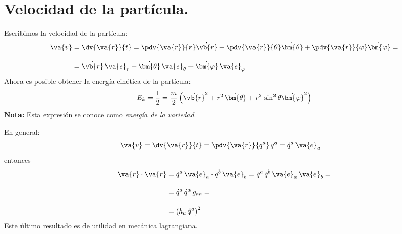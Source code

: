 \section{Velocidad de la partícula.}
Escribimos la velocidad de la partícula:
\begin{align*}
\va{v} &= \dv{\va{r}}{t} = \pdv{\va{r}}{r} \dot{\vb{r}} + \pdv{\va{r}}{\theta} \dot{\bm{\theta}} + \pdv{\va{r}}{\varphi} \dot{\bm{\varphi}} = \\[1em]
&= \dot{\vb{r}} \, \va{e}_{r} + \dot{\bm{\theta}} \, \va{e}_{\theta} + \dot{\bm{\varphi}} \, \va{e}_{\varphi}
\end{align*}
Ahora es posible obtener la energía cinética de la partícula:
\begin{align*}
E_{k} = \dfrac{1}{2} = \dfrac{m}{2} \left( \dot{\vb{r}}^{2} + r^{2} \, \dot{\bm{\theta}} + r^{2} \, \sin^{2} \theta \dot{\bm{\varphi}}^{2} \right)
\end{align*}
\textbf{Nota: } Esta expresión se conoce como \emph{energía de la variedad}.
\par
En general:
\begin{align*}
\va{v} &= \dv{\va{r}}{t} = \pdv{\va{r}}{q^{a}} \, q^{a} = \dot{q}^{a} \, \va{e}_{a}
\end{align*}
entonces
\begin{align*}
\va{r} \cdot \va{r} &= \dot{q}^{a} \, \va{e}_{a} \cdot \dot{q}^{b} \, \va{e}_{b} = \dot{q}^{a} \, \dot{q}^{b} \, \va{e}_{a} \, \va{e}_{b} = \\[1em]
&= \dot{q}^{a} \, \dot{q}^{a} \, g_{aa} = \\[1em]
&= \left( h_{a} \, \dot{q}^{a} \right)^{2}
\end{align*}
Este último resultado es de utilidad en mecánica lagrangiana.
